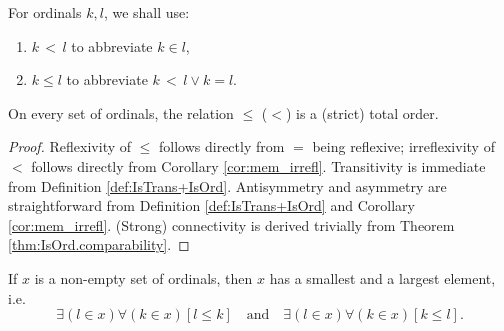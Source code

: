 \begin{definition}
    \label{def:Ord.lt+Ord.le}
    \leanok
    For ordinals $k,l$, we shall use:
    \begin{enumerate}
    \item $k\,<\,l$ to abbreviate $k \in l$,
    \item $k \leq l$ to abbreviate $k\,<\,l \lor k = l$.
    \end{enumerate}
\end{definition}

\begin{theorem}
    \label{thm:Ord.le_totalOrder+Ord.lt_sTotalOrder}
    \leanok
    On every set of ordinals, the relation $\leq$ ($<$) is a (strict) total order.
\end{theorem}

\begin{proof}
    \leanok
    Reflexivity of $\leq$ follows directly from $=$ being reflexive; 
    irreflexivity of $<$ follows directly from Corollary \ref{cor:mem_irrefl}.
    Transitivity is immediate from Definition \ref{def:IsTrans+IsOrd}.
    Antisymmetry and asymmetry are straightforward from Definition \ref{def:IsTrans+IsOrd} and
    Corollary \ref{cor:mem_irrefl}.
    (Strong) connectivity is derived trivially from Theorem \ref{thm:IsOrd.comparability}.
\end{proof}

\begin{theorem}
    \label{thm:IsOrd.exists_max_of_set+IsOrd.exists_min_of_set}
    \leanok
    If $x$ is a non-empty set of ordinals, then $x$ has a smallest and a largest element, 
    i.e.
    \begin{equation*}
    \exists(l \in x) \forall (k \in x) [l \leq k]\quad\text{and}\quad\exists(l \in x) 
    \forall (k \in x) [k \leq l].
    \end{equation*}
\end{theorem}

